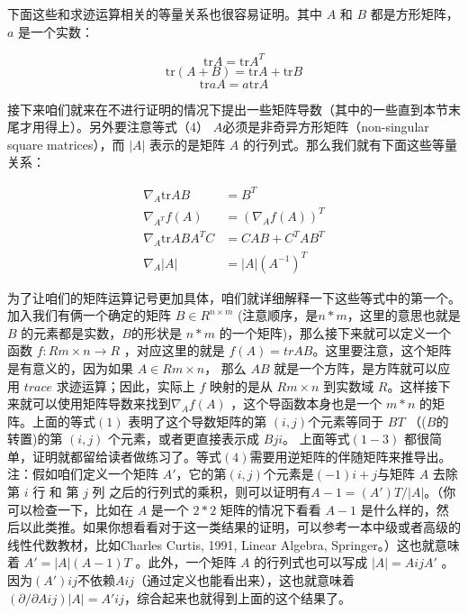 \documentclass[UTF8]{ctexart}
\begin{document}
		下面这些和求迹运算相关的等量关系也很容易证明。其中 $A$ 和 $B$ 都是方形矩阵，$a$ 是一个实数： 
		
		\[ \mathrm{tr}A = \mathrm{tr}A^{T} \]
		\[ \mathrm{tr}(A+B) = \mathrm{tr}A + \mathrm{tr}B\]
		\[ \mathrm{tr}aA = a\mathrm{tr}A \]
		
		接下来咱们就来在不进行证明的情况下提出一些矩阵导数（其中的一些直到本节末尾才用得上）。另外要注意等式（4） $ A $必须是非奇异方形矩阵（non-singular square matrices），而 $|A|$ 表示的是矩阵 $A$ 的行列式。那么我们就有下面这些等量关系： 
		
		\begin{align}
			\nabla_{A}\mathrm{tr}AB &= B^{T} \\
			\nabla_{A^{T}}f(A) &= (\nabla_{A}f(A))^{T} \\
			\nabla_{A}\mathrm{tr}ABA^{T}C &= CAB + C^{T}AB^{T} \\
			\nabla_{A}|A| &= |A|(A^{-1})^{T} 
		\end{align}
		
		为了让咱们的矩阵运算记号更加具体，咱们就详细解释一下这些等式中的第一个。加入我们有俩一个确定的矩阵 $B \in R^{n×m}$  (注意顺序，是$n*m$，这里的意思也就是 $B$ 的元素都是实数，$B$的形状是 $n*m$ 的一个矩阵)，那么接下来就可以定义一个函数 $f: Rm×n \longrightarrow R$ ，对应这里的就是 $f(A) = trAB$。这里要注意，这个矩阵是有意义的，因为如果 $A ∈ Rm×n $， 那么 $AB$ 就是一个方阵，是方阵就可以应用 $trace$ 求迹运算；因此，实际上 $f$ 映射的是从 $Rm×n$ 到实数域 $R$。这样接下来就可以使用矩阵导数来找到$ \nabla_{A}f(A) $ ，这个导函数本身也是一个 $m*n$ 的矩阵。上面的等式$(1)$ 表明了这个导数矩阵的第 $(i, j)$个元素等同于 $BT$ （($B$的转置)的第 $(i, j)$ 个元素，或者更直接表示成 $Bji$。 
		上面等式$(1-3)$ 都很简单，证明就都留给读者做练习了。等式$(4)$需要用逆矩阵的伴随矩阵来推导出。
		注：假如咱们定义一个矩阵 $A′$，它的第$ (i, j) $个元素是$ (−1)i+j $与矩阵 $A$ 去除 第 $i$ 行 和 第 $j$ 列 之后的行列式的乘积，则可以证明有$A−1 = (A′)T /|A|$。（你可以检查一下，比如在 $A$ 是一个 $2*2$ 矩阵的情况下看看 $A-1$ 是什么样的，然后以此类推。如果你想看看对于这一类结果的证明，可以参考一本中级或者高级的线性代数教材，比如Charles Curtis, 1991, Linear Algebra, Springer。）这也就意味着 $A′ = |A|(A−1)T$ 。此外，一个矩阵 $A$ 的行列式也可以写成 $|A| = AijA′$ 。因为$ (A′)ij $不依赖$ Aij $（通过定义也能看出来），这也就意味着$(∂/∂Aij)|A| = A′ij $，综合起来也就得到上面的这个结果了。
		
		
	
	
		
\end{document}
